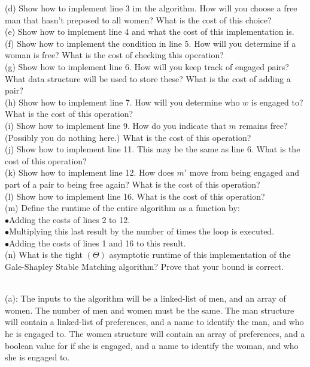 \documentclass{assignment}
\begin{document}
\begin{problemlist}
(d) Show how to implement line 3 im the algorithm. How will you choose a free man that hasn't preposed to all women? What is the cost of this choice?\\
(e) Show how to implement line 4 and what the cost of this implementation is.\\
(f) Show how to implement the condition in line 5. How will you determine if a woman is free? What is the cost of checking this operation?\\
(g) Show how to implement line 6. How will you keep track of engaged pairs? What data structure will be used to store these? What is the cost of adding a pair?\\
(h) Show how to implement line 7. How will you determine who $w$ is engaged to? What is the cost of this operation?\\
(i) Show how to implement line 9. How do you indicate that $m$ remains free? (Possibly you do nothing here.) What is the cost of this operation?\\
(j) Show how to implement line 11. This may be the same as line 6. What is the cost of this operation?\\
(k) Show how to implement line 12. How does $m'$ move from being engaged and part of a pair to being free again? What is the cost of this operation?\\
(l) Show how to implement line 16. What is the cost of this operation?\\
(m) Define the runtime of the entire algorithm as a function by:\\
$\bullet$Adding the costs of lines 2 to 12.\\
$\bullet$Multiplying this last result by the number of times the loop is executed.\\
$\bullet$Adding the costs of lines 1 and 16 to this result.\\
(n) What is the tight $(\Theta)$ asymptotic runtime of this implementation of the Gale-Shapley Stable Matching algorithm? Prove that your bound is correct.\\
\begin{answer}
\\
(a): The inputs to the algorithm will be a linked-list of men, and an array of women. The number of men and women must be the same. The man structure will contain a linked-list of preferences, and a name to identify the man, and who he is engaged to. The women structure will contain an array of preferences, and a boolean value for if she is engaged, and a name to identify the woman, and who she is engaged to.\\

\end{answer}
\end{problemlist}
\end{document}
